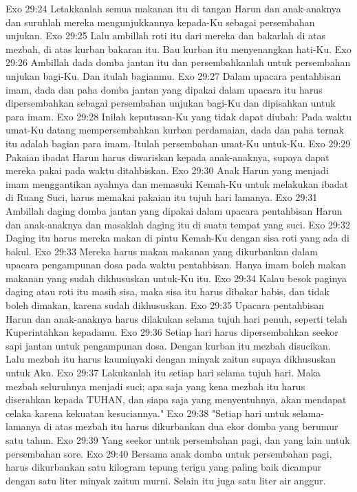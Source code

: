 Exo 29:24  Letakkanlah semua makanan itu di tangan Harun dan anak-anaknya dan suruhlah mereka mengunjukkannya kepada-Ku sebagai persembahan unjukan.
Exo 29:25  Lalu ambillah roti itu dari mereka dan bakarlah di atas mezbah, di atas kurban bakaran itu. Bau kurban itu menyenangkan hati-Ku.
Exo 29:26  Ambillah dada domba jantan itu dan persembahkanlah untuk persembahan unjukan bagi-Ku. Dan itulah bagianmu.
Exo 29:27  Dalam upacara pentahbisan imam, dada dan paha domba jantan yang dipakai dalam upacara itu harus dipersembahkan sebagai persembahan unjukan bagi-Ku dan dipisahkan untuk para imam.
Exo 29:28  Inilah keputusan-Ku yang tidak dapat diubah: Pada waktu umat-Ku datang mempersembahkan kurban perdamaian, dada dan paha ternak itu adalah bagian para imam. Itulah persembahan umat-Ku untuk-Ku.
Exo 29:29  Pakaian ibadat Harun harus diwariskan kepada anak-anaknya, supaya dapat mereka pakai pada waktu ditahbiskan.
Exo 29:30  Anak Harun yang menjadi imam menggantikan ayahnya dan memasuki Kemah-Ku untuk melakukan ibadat di Ruang Suci, harus memakai pakaian itu tujuh hari lamanya.
Exo 29:31  Ambillah daging domba jantan yang dipakai dalam upacara pentahbisan Harun dan anak-anaknya dan masaklah daging itu di suatu tempat yang suci.
Exo 29:32  Daging itu harus mereka makan di pintu Kemah-Ku dengan sisa roti yang ada di bakul.
Exo 29:33  Mereka harus makan makanan yang dikurbankan dalam upacara pengampunan dosa pada waktu pentahbisan. Hanya imam boleh makan makanan yang sudah dikhususkan untuk-Ku itu.
Exo 29:34  Kalau besok paginya daging atau roti itu masih sisa, maka sisa itu harus dibakar habis, dan tidak boleh dimakan, karena sudah dikhususkan.
Exo 29:35  Upacara pentahbisan Harun dan anak-anaknya harus dilakukan selama tujuh hari penuh, seperti telah Kuperintahkan kepadamu.
Exo 29:36  Setiap hari harus dipersembahkan seekor sapi jantan untuk pengampunan dosa. Dengan kurban itu mezbah disucikan. Lalu mezbah itu harus kauminyaki dengan minyak zaitun supaya dikhususkan untuk Aku.
Exo 29:37  Lakukanlah itu setiap hari selama tujuh hari. Maka mezbah seluruhnya menjadi suci; apa saja yang kena mezbah itu harus diserahkan kepada TUHAN, dan siapa saja yang menyentuhnya, akan mendapat celaka karena kekuatan kesuciannya."
Exo 29:38  "Setiap hari untuk selama-lamanya di atas mezbah itu harus dikurbankan dua ekor domba yang berumur satu tahun.
Exo 29:39  Yang seekor untuk persembahan pagi, dan yang lain untuk persembahan sore.
Exo 29:40  Bersama anak domba untuk persembahan pagi, harus dikurbankan satu kilogram tepung terigu yang paling baik dicampur dengan satu liter minyak zaitun murni. Selain itu juga satu liter air anggur.
